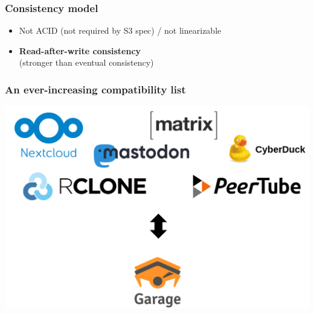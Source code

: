 \documentclass[aspectratio=169]{beamer}
\begin{document}
\begin{frame}
	\frametitle{Consistency model}
	\begin{itemize}
		\item Not ACID (not required by S3 spec) / not linearizable
			\vspace{1em}
		\item \textbf{Read-after-write consistency}\\
			{\footnotesize (stronger than eventual consistency)}
	\end{itemize}
\end{frame}


\begin{frame}
	\frametitle{An ever-increasing compatibility list}
		\begin{center}
			\includegraphics[width=.7\linewidth]{assets/compatibility.png}
		\end{center}
\end{frame}
\end{document}
